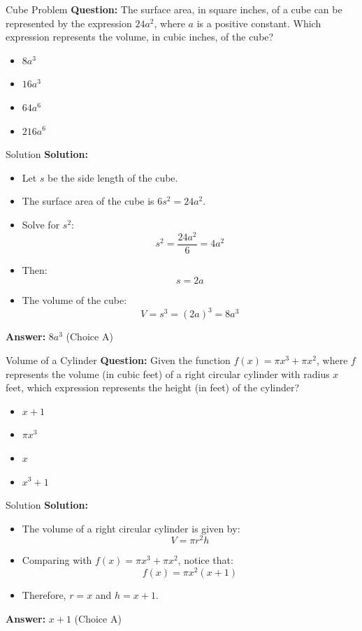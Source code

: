 \documentclass{beamer}
\begin{document}
\begin{frame}{Cube Problem}
\textbf{Question:}  
The surface area, in square inches, of a cube can be represented by the expression \(24a^2\), where \(a\) is a positive constant. Which expression represents the volume, in cubic inches, of the cube?

\begin{itemize}
    \item[A)] \(8a^3\)
    \item[B)] \(16a^3\)
    \item[C)] \(64a^6\)
    \item[D)] \(216a^6\)
\end{itemize}
\end{frame}


\begin{frame}{Solution}
\textbf{Solution:}
\begin{itemize}
    \item Let \(s\) be the side length of the cube.
    \item The surface area of the cube is \(6s^2 = 24a^2\).
    \item Solve for \(s^2\):
    \[
    s^2 = \frac{24a^2}{6} = 4a^2
    \]
    \item Then:
    \[
    s = 2a
    \]
    \item The volume of the cube:
    \[
    V = s^3 = (2a)^3 = 8a^3
    \]
\end{itemize}

\textbf{Answer:} \(8a^3\) (Choice A)
\end{frame}



\begin{frame}{Volume of a Cylinder}
\textbf{Question:}  
Given the function \( f(x) = \pi x^3 + \pi x^2 \), where \( f \) represents the volume (in cubic feet) of a right circular cylinder with radius \( x \) feet, which expression represents the height (in feet) of the cylinder?

\begin{itemize}
    \item[A)] \( x + 1 \)
    \item[B)] \( \pi x^3 \)
    \item[C)] \( x \)
    \item[D)] \( x^3 + 1 \)
\end{itemize}
\end{frame}


\begin{frame}{Solution}
\textbf{Solution:}
\begin{itemize}
    \item The volume of a right circular cylinder is given by:
    \[
    V = \pi r^2 h
    \]
    \item Comparing with \( f(x) = \pi x^3 + \pi x^2 \), notice that:
    \[
    f(x) = \pi x^2 (x + 1)
    \]
    \item Therefore, \( r = x \) and \( h = x + 1 \).
\end{itemize}

\textbf{Answer:} \( x + 1 \) (Choice A)
\end{frame}
\end{document}
